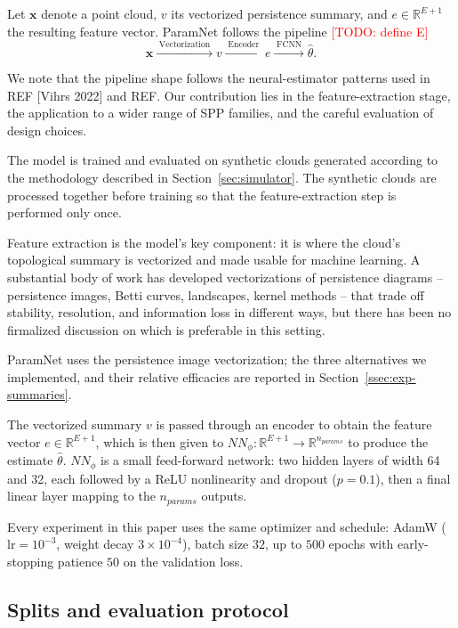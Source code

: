 \documentclass[11pt,letterpaper]{article}
\newcommand{\R}{\mathbb{R}}
\newcommand{\1}{\mathds{1}}
\newcommand{\pc}{\mathbf{x}}
\newcommand{\todo}[1]{\textcolor{red}{[TODO: #1]}}
\newcommand{\fix}[1]{\textcolor{blue}{[FIX: #1]}}
\newcommand{\todo}[1]{}\newcommand{\fix}[1]{}
\theoremstyle{plain}
\theoremstyle{definitioncolon}
\begin{document}
Let $\pc$ denote a point cloud, $v$ its vectorized persistence summary, and
$e \in \R^{E + 1}$ the resulting feature vector. ParamNet follows the pipeline \todo{define E}
    \begin{equation}
    \label{eq:pipeline}
    \pc \xrightarrow{\;\text{Vectorization}\;} v
    \xrightarrow{\;\text{Encoder}\;} e
    \xrightarrow{\;\text{FCNN}\;} \hat\theta.
    \end{equation}

We note that the pipeline shape follows the neural-estimator patterns used in REF [Vihrs 2022]
and REF. Our contribution lies in the feature-extraction stage, the application to
a wider range of SPP families, and the careful evaluation of design choices.

The model is trained and evaluated on synthetic clouds generated according to the
methodology described in Section~\ref{sec:simulator}. The synthetic clouds are processed
together before training so that the feature-extraction step is performed only
once.

Feature extraction is the model's key component: it is where the cloud's
topological summary is vectorized and made usable for machine learning.
A substantial body of work has developed vectorizations of persistence
diagrams -- persistence images, Betti curves, landscapes, kernel methods --
that trade off stability, resolution, and information loss in different ways,
but there has been no firmalized discussion on which is preferable in this setting.

ParamNet uses the persistence image vectorization; the three alternatives we implemented,
and their relative efficacies are reported in Section~\ref{ssec:exp-summaries}.

The vectorized summary $v$ is passed through an encoder to obtain the
feature vector $e \in \R^{E + 1}$, which is then given to 
$NN_\phi: \R^{E + 1} \to \R^{n_{params}}$ to produce the estimate
$\hat\theta$. $NN_\phi$ is a small feed-forward network: 
two hidden layers of width 64 and 
32, each followed by a ReLU nonlinearity and dropout ($p=0.1$), then a final
linear layer mapping to the $n_{params}$ outputs.

Every experiment in this paper uses the same optimizer and schedule: AdamW ($\text{lr}=10^{-3}$,
weight decay $3\times10^{-4}$), batch size $32$, up to $500$ epochs with
early-stopping patience $50$ on the validation loss.

\subsection{Splits and evaluation protocol}
\label{ssec:eval-protocol}
\end{document}
